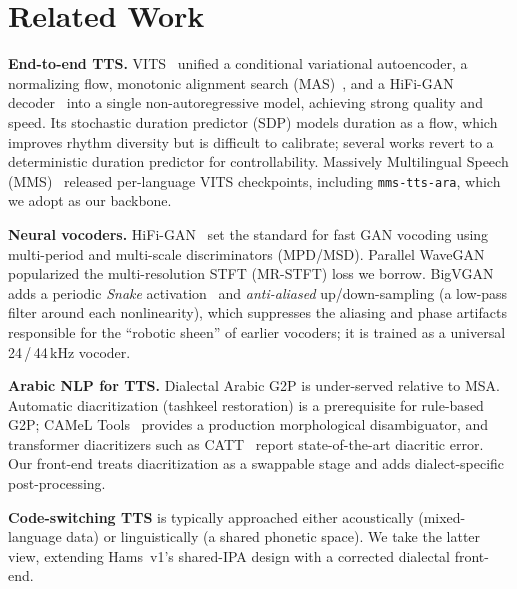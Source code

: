 \documentclass[10pt,twocolumn]{article}
\begin{document}
\section{Related Work}
\textbf{End-to-end TTS.} VITS~\cite{vits} unified a conditional variational autoencoder, a
normalizing flow, monotonic alignment search (MAS)~\cite{glowtts}, and a HiFi-GAN
decoder~\cite{hifigan} into a single non-autoregressive model, achieving strong quality and
speed. Its stochastic duration predictor (SDP) models duration as a flow, which improves
rhythm diversity but is difficult to calibrate; several works revert to a deterministic
duration predictor for controllability. Massively Multilingual Speech (MMS)~\cite{mms}
released per-language VITS checkpoints, including \texttt{mms-tts-ara}, which we adopt as
our backbone.

\textbf{Neural vocoders.} HiFi-GAN~\cite{hifigan} set the standard for fast GAN vocoding
using multi-period and multi-scale discriminators (MPD/MSD). Parallel
WaveGAN~\cite{pwg} popularized the multi-resolution STFT (MR-STFT) loss we borrow.
BigVGAN~\cite{bigvgan} adds a periodic \emph{Snake} activation~\cite{snake} and
\emph{anti-aliased} up/down-sampling (a low-pass filter around each nonlinearity), which
suppresses the aliasing and phase artifacts responsible for the ``robotic sheen'' of
earlier vocoders; it is trained as a universal 24\,/\,44\,kHz vocoder.

\textbf{Arabic NLP for TTS.} Dialectal Arabic G2P is under-served relative to MSA. Automatic
diacritization (tashkeel restoration) is a prerequisite for rule-based G2P; CAMeL
Tools~\cite{cameltools} provides a production morphological disambiguator, and
transformer diacritizers such as CATT~\cite{catt} report state-of-the-art diacritic error.
Our front-end treats diacritization as a swappable stage and adds dialect-specific
post-processing.

\textbf{Code-switching TTS} is typically approached either acoustically (mixed-language
data) or linguistically (a shared phonetic space). We take the latter view, extending
Hams~v1's shared-IPA design with a corrected dialectal front-end.
\end{document}
